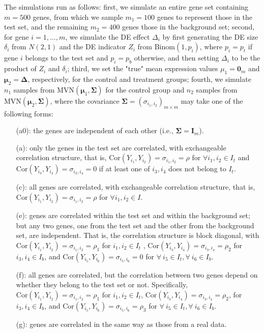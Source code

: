 \documentclass[11pt, a4paper]{article}
\begin{document}
		The simulations run as follows: first, we simulate an entire gene set containing $m=500$ genes, from which we sample $m_1 = 100$ genes to represent those in the test set, and the remaining $m_2=400$ genes those in the background set; second, for gene $i=1, \ldots, m$, we simulate the DE effect $\Delta_i$ by first generating the DE size $\delta_i$ from $N(2, 1)$ and the DE indicator $Z_i$ from $\text{Binom}(1, p_i)$,  where $p_i= p_t$ if gene $i$ belongs to the test set and $p_i = p_b$  otherwise, and then setting $\Delta_i$ to be the product of $Z_i$ and $\delta_i$; third, we set the "true" mean expression values $\mu_1 = \bm 0_m$ and $\bm \mu_2 = \bm \Delta$, respectively,  for the control and treatment groups; fourth, we simulate $n_1$ samples from $\text{MVN}(\bm \mu_1, \bm \Sigma)$ for the control group and $n_2$ samples from $\text{MVN}(\bm \mu_2, \bm \Sigma)$, where the covariance $\bm \Sigma = (\sigma_{i_1, i_2})_{m\times m} $ may take one of the following forms: 
		\begin{enumerate}
			\item[(a0):] the genes are independent of each other (i.e., $\bm \Sigma = \bm I_m$).
			\item[(a):] only the genes in the test set are correlated, with exchangeable correlation structure, that is, $\text{Cor}(Y_{i_1}, Y_{i_2})=\sigma_{i_1, i_2}=\rho$ for $\forall i_1, i_2 \in I_t$ and  $\text{Cor}(Y_{i_3}, Y_{i_4})=\sigma_{i_3, i_4}=0$ if at least one of $i_3, i_4$ does not belong to $I_t$.
			\item[(c):] all genes are correlated, with exchangeable correlation structure, that is, $\text{Cor}(Y_{i_1}, Y_{i_2})=\sigma_{i_1, i_2}=\rho$ for $\forall i_1, i_2 \in I$.
			\item[(e):] genes are correlated within the test set and within the background set; but any two genes, one from the test set and the other from the background set, are independent. That is, the correlation structure is block diagonal, with $\text{Cor}(Y_{i_1}, Y_{i_2})= \sigma_{i_1, i_2}= \rho_1$ for $i_1, i_2 \in I_t$  , $\text{Cor}(Y_{i_3}, Y_{i_4}) = \sigma_{i_3, i_4}=\rho_2$ for $i_3, i_4\in I_b$, and  $\text{Cor}(Y_{i_5}, Y_{i_6})=\sigma_{i_5, i_6}= 0$ for $\forall ~i_5\in I_t, \forall~ i_6\in I_b$.
			\item[(f):] all genes are correlated, but the correlation between two genes depend on whether they belong to the test set or not. Specifically, $\text{Cor}(Y_{i_1}, Y_{i_2})=\sigma_{i_1, i_2}=\rho_1$  for $i_1, i_2 \in I_t$,    $\text{Cor}(Y_{i_3}, Y_{i_4})=\sigma_{i_3, i_4} =\rho_2$, for $ i_3, i_4\in I_b$, and  $\text{Cor}(Y_{i_5}, Y_{i_6})= \sigma_{i_5, i_6}= \rho_3$ for $\forall~ i_5\in I_t, \forall~ i_6\in I_b$.
			\item[(g):] genes are correlated in the same way as those from a real data.
		\end{enumerate}
		
\end{document}
